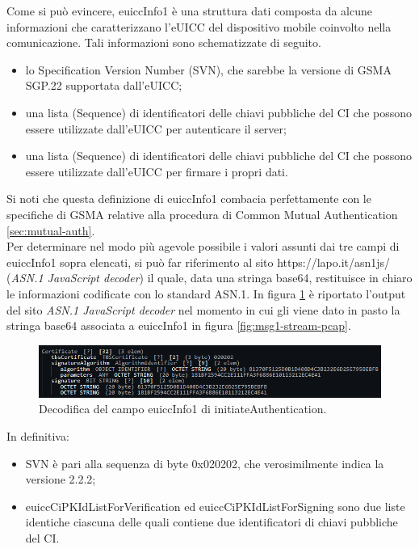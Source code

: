 \documentclass[10pt, oneside]{book}
\begin{document}
Come si può evincere, euiccInfo1 è una struttura dati composta da alcune informazioni che caratterizzano l'eUICC del dispositivo mobile coinvolto nella comunicazione. Tali informazioni sono schematizzate di seguito.
\begin{itemize}
\item lo Specification Version Number (SVN), che sarebbe la versione di GSMA SGP.22 supportata dall'eUICC;
\item una lista (Sequence) di identificatori delle chiavi pubbliche del CI che possono essere utilizzate dall'eUICC per autenticare il server;
\item una lista (Sequence) di identificatori delle chiavi pubbliche del CI che possono essere utilizzate dall'eUICC per firmare i propri dati.
\end{itemize}
Si noti che questa definizione di euiccInfo1 combacia perfettamente con le specifiche di GSMA \cite{GSMA-docs-new} relative alla procedura di Common Mutual Authentication \ref{sec:mutual-auth}.\\
Per determinare nel modo più agevole possibile i valori assunti dai tre campi di euiccInfo1 sopra elencati, si può far riferimento al sito https://lapo.it/asn1js/ (\textit{ASN.1 JavaScript decoder}) il quale, data una stringa base64, restituisce in chiaro le informazioni codificate con lo standard ASN.1. In figura \ref{fig:decode-euiccInfo1} è riportato l'output del sito \textit{ASN.1 JavaScript decoder} nel momento in cui gli viene dato in pasto la stringa base64 associata a euiccInfo1 in figura \ref{fig:msg1-stream-pcap}.
\begin{figure}
\includegraphics[width=\linewidth]{decode-euiccInfo1.png}
\caption{Decodifica del campo euiccInfo1 di initiateAuthentication.}
\label{fig:decode-euiccInfo1}
\end{figure}
In definitiva:
\begin{itemize}
\item SVN è pari alla sequenza di byte 0x020202, che verosimilmente indica la versione 2.2.2;
\item euiccCiPKIdListForVerification ed euiccCiPKIdListForSigning sono due liste identiche ciascuna delle quali contiene due identificatori di chiavi pubbliche del CI.
\end{itemize}
\end{document}
